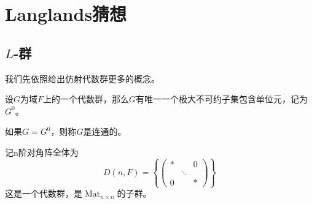 \chapter{Langlands猜想}
\label{chap:langlands}

\section{$L$-群}
\label{sec:l_gp}
我们先依照给出仿射代数群更多的概念。

设$G$为域$F$上的一个代数群，那么$G$有唯一一个极大不可约子集包含单位元，记为$G^0$。

\begin{definition}
如果$G = G^0$，则称$G$是连通的。
\end{definition}
记n阶对角阵全体为
$$
D(n,F) = \left\{ \begin{pmatrix} \ast & & 0 \\ & \ddots & \\ 0 & & \ast\end{pmatrix} \right\}
$$
这是一个代数群，是$\operatorname{Mat}_{n\times n}$的子群。

